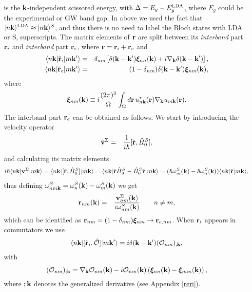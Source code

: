 \documentclass[floatfix,prb,aps,superscriptaddress,11pt,preprint]{revtex4}
\begin{document}
 is the $\mathbf{k}$-independent scissored
energy, with $\Delta=E_g-E_g^{\mathrm{LDA}}$, where $E_g$ could be the experimental
or GW band gap. In above we used the fact that 
$| n\mathbf{k} \rangle^{\mathrm{LDA}}\approx| n\mathbf{k} \rangle^S$, and thus there is no need to label
the Bloch states with LDA or S, superscripts. 
The matrix elements of $\mathbf{r}$ are split between its {\it interband}
part $\mathbf{r}_i$ and {\it interband} part $\mathbf{r}_e$, where 
$\mathbf{r}=\mathbf{r}_i+\mathbf{r}_e$ and\cite{adamsJCP53,blountSSP62,aversaPRB95}
\begin{eqnarray}\label{rnminn}
\langle n\mathbf{k} |\hat{\mathbf{r}}_i| m\mathbf{k}' \rangle &=& \delta_{nm}\left[\delta(\mathbf{k}-\mathbf{k}')\boldsymbol{\xi}_{nn}(\mathbf{k})
+i\nabla_{\mathbf{k}}\delta(\mathbf{k}-\mathbf{k}')\right], \\
\langle n\mathbf{k} |\hat{\mathbf{r}}_e| m\mathbf{k}' \rangle &=&
(1-\delta_{nm})\delta(\mathbf{k}-\mathbf{k}')\boldsymbol{\xi}_{nm}(\mathbf{k})
,
\label{rnmenn}
\end{eqnarray}
where
\begin{equation}\label{zetann}
\boldsymbol{\xi}_{nm}(\mathbf{k}) \equiv i\frac{(2\pi)^3}{\Omega}\int_{\Omega} d\mathbf{r}\, u^*_{n\mathbf{k}}(\mathbf{r})\nabla_{\mathbf{k}}u_{m\mathbf{k}}(\mathbf{r}).
\end{equation}
The interband part $\mathbf{r}_e$ can
be obtained as follows. 
We start by introducing the 
velocity operator
\begin{eqnarray}\label{vop}
\hat{\mathbf{v}}^\Sigma&=&
\frac{1}{i\hbar}[\hat{\mathbf{r}},\hat{H}^S_0]
,
\end{eqnarray}
and calculating its matrix elements
\begin{equation}\label{conhrnm}
i\hbar\langle n\mathbf{k} |
\mathbf{v}^\Sigma
| m\mathbf{k} \rangle
=
\langle n\mathbf{k} |
[\hat{\mathbf{r}},\hat{H}^S_0]
| m\mathbf{k} \rangle
=\langle n\mathbf{k} |\hat{\mathbf{r}}\hat{H}^S_0-\hat{H}^S_0\hat{\mathbf{r}}| m\mathbf{k} \rangle
=(\hbar\omega^S_m(\mathbf{k})-\hbar\omega^S_n(\mathbf{k}))\langle n\mathbf{k} |\hat{\mathbf{r}}| m\mathbf{k} \rangle
,
\end{equation}
thus defining $\omega^S_{nm\mathbf{k}}=\omega^S_n(\mathbf{k})-\omega^S_m(\mathbf{k})$ we get
\begin{eqnarray}\label{pmnrmn}
\mathbf{r}_{nm}(\mathbf{k})
&=&
\frac{\mathbf{v}^\Sigma_{nm}(\mathbf{k})}{i\omega^S_{nm}(\mathbf{k})}
\quad\quad n\ne m
,
\end{eqnarray} 
which can be identified as 
$\mathbf{r}_{nm}=(1-\delta_{nm})\boldsymbol{\xi}_{nm}\to \mathbf{r}_{e,nm}$.
When  $\mathbf{r}_i$ appears in
commutators we use\cite{aversaPRB95} 
\begin{equation}\label{conmri3n}
\langle n\mathbf{k} |[\hat{\mathbf{r}}_i,\hat{{\cal O}}]| m\mathbf{k}' \rangle
=i\delta(\mathbf{k}-\mathbf{k}')({\cal O}_{nm})_{;\mathbf{k}}
,
\end{equation}  
with
\begin{equation}\label{gendevnn}
({\cal O}_{nm})_{;\mathbf{k}}=
\nabla_{\mathbf{k}}
{\cal O}_{n m}(\mathbf{k})
- 
i
{\cal O}_{nm}(\mathbf{k})
\left(
\boldsymbol{\xi}_{nn}(\mathbf{k})
-
\boldsymbol{\xi}_{mm}(\mathbf{k})
\right)
,
\end{equation} 
where $;\mathbf{k}$ denotes the generalized derivative (see Appendix \ref{reri}). 
\end{document}
